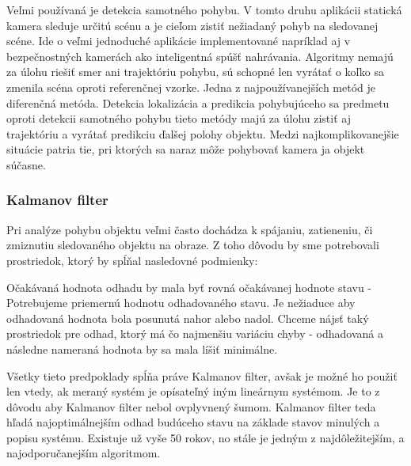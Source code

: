 Veľmi používaná je detekcia samotného pohybu. V tomto druhu aplikácii statická kamera sleduje určitú scénu a je cieľom zistiť nežiadaný pohyb na sledovanej scéne. Ide o veľmi jednoduché aplikácie implementované napríklad aj v bezpečnostných kamerách ako inteligentná spúšť nahrávania.  Algoritmy nemajú za úlohu riešiť smer ani trajektóriu pohybu, sú schopné len vyrátať o koľko sa zmenila scéna oproti referenčnej vzorke. Jedna z najpoužívanejších metód je diferenčná metóda. Detekcia lokalizácia a predikcia pohybujúceho sa predmetu oproti detekcii samotného pohybu tieto metódy majú  za úlohu zistiť aj trajektóriu a vyrátať predikciu ďalšej polohy objektu. Medzi najkomplikovanejšie situácie patria tie, pri ktorých sa naraz môže pohybovať kamera ja objekt súčasne.

\subsubsection{Kalmanov filter}
Pri analýze pohybu objektu veľmi často dochádza k spájaniu, zatieneniu, či zmiznutiu sledovaného  objektu na obraze. Z toho dôvodu by sme potrebovali prostriedok, ktorý by spĺňal nasledovné podmienky: 


Očakávaná hodnota odhadu by mala byť rovná očakávanej hodnote stavu - Potrebujeme priemernú hodnotu odhadovaného stavu. Je nežiaduce aby odhadovaná hodnota bola posunutá nahor alebo nadol. 
Chceme nájsť taký prostriedok pre odhad, ktorý má čo najmenšiu variáciu chyby - odhadovaná a následne nameraná hodnota by sa mala líšiť minimálne. 



Všetky tieto predpoklady spĺňa práve Kalmanov filter, avšak je možné ho použiť len vtedy, ak  meraný systém je opísateľný iným lineárnym systémom. Je to z dôvodu aby Kalmanov filter nebol ovplyvnený šumom. Kalmanov filter teda hľadá najoptimálnejším odhad budúceho stavu na základe stavov minulých a popisu systému.  Existuje už vyše 50 rokov, no stále je jedným z najdôležitejším, a najodporučanejším algoritmom.

